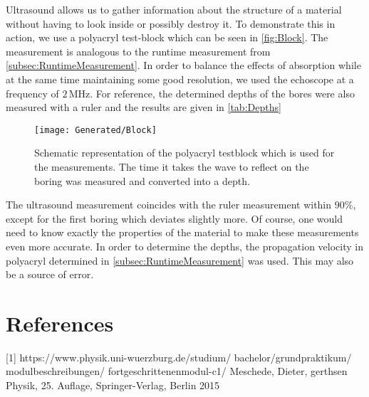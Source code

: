 \documentclass[a4paper,10pt,twocolumn]{article}
\begin{document}
    Ultrasound allows us to gather information about the structure of a material without having to look inside or possibly destroy it.
    To demonstrate this in action, we use a polyacryl test-block which can be seen in \autoref{fig:Block}.
    The measurement is analogous to the runtime measurement from \autoref{subsec:RuntimeMeasurement}.
    In order to balance the effects of absorption while at the same time maintaining some good resolution, we used the echoscope at a frequency of $2\,$MHz.
    For reference, the determined depths of the bores were also measured with a ruler and the results are given in \autoref{tab:Depths}
    \begin{figure}
        \begin{center}
            \texttt{[image: Generated/Block]}
            \caption[]{Schematic representation of the polyacryl testblock which is used for the measurements.
            The time it takes the wave to reflect on the boring was measured and converted into a depth.}
            \label{fig:Block}
        \end{center}
    \end{figure}
    
    The ultrasound measurement coincides with the ruler measurement within $90 \% $, except for the first boring which deviates slightly more.
    Of course, one would need to know exactly the properties of the material to make these measurements even more accurate.
    In order to determine the depths, the propagation velocity in polyacryl determined in \autoref{subsec:RuntimeMeasurement} was used.
    This may also be a source of error.
    
    \section{References}
    [1] https://www.physik.uni-wuerzburg.de/studium/ bachelor/grundpraktikum/ modulbeschreibungen/ fortgeschrittenenmodul-c1/
    \newline
    [2] Meschede, Dieter, gerthsen Physik, 25. Auflage, Springer-Verlag, Berlin 2015
    
\end{document}
